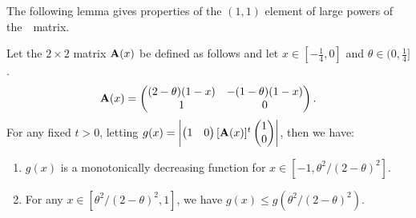 \noindent
The following lemma gives properties of the $(1,1)$ element of large 
powers of the~\nag~matrix.
\begin{lemma}\label{lem:aux_increase_x}
Let the $2\times 2$ matrix $\mathbf{A}(x)$ be defined as follows and let
$x\in[-\frac{1}{4}, 0]$ and $\theta \in (0, \frac{1}{4}]$.
\begin{equation*}
\mathbf{A}(x) = \begin{pmatrix} (2-\theta) (1 - x)&  -(1-\theta) (1 - x) \\1 & 0 \end{pmatrix}.
\end{equation*}
For any fixed $t>0$, letting $g(x) = \left|{\begin{pmatrix} 1 & 0  \end{pmatrix}[\mathbf{A}(x)]^{t}\begin{pmatrix} 1 \\ 0  \end{pmatrix}}\right|$, 
then we have:
\begin{enumerate}
\item $g(x)$ is a monotonically decreasing function for $x \in [-1, \theta^2/(2-\theta)^2]$.
\item For any $x \in [\theta^2/(2-\theta)^2, 1]$, we have $g(x) \le g(\theta^2/(2-\theta)^2)$.
\end{enumerate}

\end{lemma}
